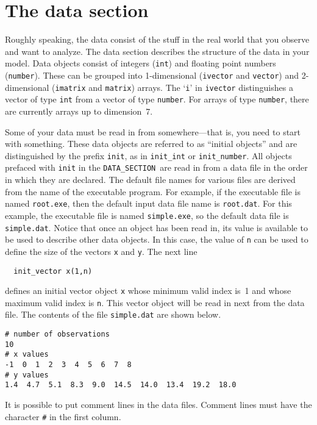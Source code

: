 \documentclass{admbmanual}
\newcommand\DS{\texttt{DATA\_SECTION}}
\begin{document}
\section{The data section}

Roughly speaking, the data consist of the stuff in the real world that you
observe and want to analyze. The data section describes the structure of the
data in your model. Data objects consist of integers (\texttt{int}) and floating
point numbers (\texttt{number}). These can be grouped into 1-dimensional
(\texttt{ivector} and \texttt{vector}) and 2-dimensional (\texttt{imatrix} and
\texttt{matrix}) arrays. The `\texttt{i}' in \texttt{ivector} distinguishes a
vector of type \texttt{int} from a vector of type \texttt{number}. For arrays of
type \texttt{number}, there are currently arrays up to dimension~7.

Some of your data must be read in from somewhere---that is, you need to start
with something. These data objects are referred to as ``initial objects'' and
are distinguished by the prefix \texttt{init}, as in \texttt{init\_int} or
\texttt{init\_number}. All objects prefaced with \texttt{init} in the \DS\ are
read in from a data file in the order in which they are declared. The default
file names for various files are derived from the name of the executable
program. For example, if the executable file is named \texttt{root.exe}, then
the default input data file name is \texttt{root.dat}. For this example, the
executable file is named \texttt{simple.exe}, so the default data file is
\texttt{simple.dat}. Notice that once an object has been read in, its value is
available to be used to describe other data objects. In this case, the value of
\texttt{n} can be used to define the size of the vectors \texttt{x} and
\texttt{y}. The next line
\begin{lstlisting}
  init_vector x(1,n)
\end{lstlisting}
defines an initial vector object \texttt{x} whose minimum valid index is~1 and
whose maximum valid index is \texttt{n}. This vector object will be read in
next from the data file. The contents of the file \texttt{simple.dat} are shown
below.
\begin{lstlisting}
# number of observations
10
# x values
-1  0  1  2  3  4  5  6  7  8
# y values
1.4  4.7  5.1  8.3  9.0  14.5  14.0  13.4  19.2  18.0
\end{lstlisting}
It is possible to put comment lines in the data files.
Comment lines must have the character {\tt\#} in the first column.
\end{document}
